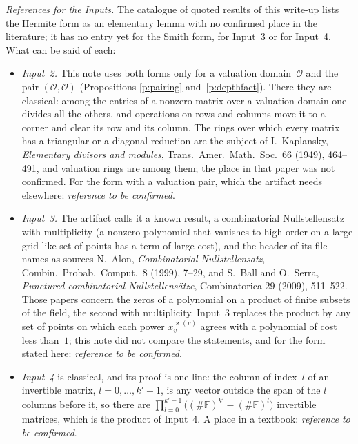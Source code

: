 \documentclass[11pt,a4paper]{article}
\newcommand{\m}[1]{\mbox{$#1$}}        %
\theoremstyle{plainx}
\theoremstyle{uprightx}
\newcommand{\cO}{\mathcal{O}}
\newcommand{\FF}{\mathbb{F}}
\begin{document}
\emph{References for the Inputs.} The catalogue of quoted results of this write-up lists the Hermite form as an
elementary lemma with no confirmed place in the literature; it has no entry yet for the Smith form, for Input~3
or for Input~4. What can be said of each:
\begin{itemize}[leftmargin=1.6em,itemsep=2pt,topsep=2pt]
\item \emph{Input~2.} This note uses both forms only for a valuation domain~$\cO$ and the pair \m{(\cO,\cO)}
(Propositions \ref{p:pairing} and~\ref{p:depthfact}). There they are classical: among the entries of a nonzero
matrix over a valuation domain one divides all the others, and operations on rows and columns move it to a corner
and clear its row and its column. The rings over which every matrix has a triangular or a diagonal reduction are
the subject of I.~Kaplansky, \emph{Elementary divisors and modules}, Trans.\ Amer.\ Math.\ Soc.\ 66 (1949),
464--491, and valuation rings are among them; the place in that paper was not confirmed. For the form with a
valuation pair, which the artifact needs elsewhere: \emph{reference to be confirmed}.
\item \emph{Input~3.} The artifact calls it a known result, a combinatorial Nullstellensatz with multiplicity (a
nonzero polynomial that vanishes to high order on a large grid-like set of points has a term of large cost), and
the header of its file names as sources N.~Alon, \emph{Combinatorial Nullstellensatz}, Combin.\ Probab.\ Comput.\
8 (1999), 7--29, and S.~Ball and O.~Serra, \emph{Punctured combinatorial Nullstellens\"atze}, Combinatorica 29
(2009), 511--522. Those papers concern the zeros of a polynomial on a product of finite subsets of the field, the
second with multiplicity. Input~3 replaces the product by any set of points on which each power
\m{x_v^{\varkappa(v)}} agrees with a polynomial of cost less than~$1$; this note did not compare the statements,
and for the form stated here: \emph{reference to be confirmed}.
\item \emph{Input~4} is classical, and its proof is one line: the column of index~$l$ of an invertible matrix,
\m{l=0,\dots,k'-1}, is any vector outside the span of the $l$ columns before it, so there are
\m{\prod_{l=0}^{k'-1}\bigl((\#\FF)^{k'}-(\#\FF)^{l}\bigr)} invertible matrices, which is the product of Input~4. A
place in a textbook: \emph{reference to be confirmed}.
\end{itemize}
\end{document}
